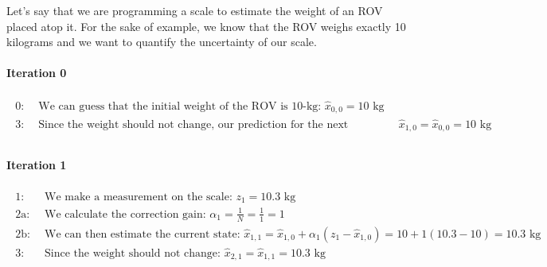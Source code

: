         \begin{example} Let's say that we are programming a scale to estimate the weight of an ROV placed atop it.
        For the sake of example, we know that the ROV weighs exactly 10 kilograms and we want to quantify the uncertainty of our scale. 
        \paragraph{Iteration 0}
        \begin{gather*}
            \begin{aligned} 
                0:& \text{ We can guess that the initial weight of the ROV is 10-kg: } \hat{x}_{0,0} = 10 \text{ kg} \\
                3:& \text{ Since the weight should not change, our prediction for the next measurement is: } \hat{x}_{1,0} = \hat{x}_{0,0} = 10 \text{ kg} \\
            \end{aligned}
        \end{gather*}
        
        \paragraph{Iteration 1}
        \begin{gather*}
            \begin{aligned} 
                1:& \text{ We make a measurement on the scale: } z_1 = 10.3 \text{ kg} \\
                2\text{a}:& \text{ We calculate the correction gain: } \alpha_1 = \frac{1}{N} = \frac{1}{1} = 1 \\
                2\text{b}:& \text{ We can then estimate the current state: } \hat{x}_{1,1} = \hat{x}_{1,0} + \alpha_1(z_1 - \hat{x}_{1,0}) = 10 + 1(10.3 - 10) = 10.3 \text{ kg} \\
                3:& \text{ Since the weight should not change: } \hat{x}_{2,1} = \hat{x}_{1,1} = 10.3 \text{ kg} \\
            \end{aligned}
        \end{gather*}


\end{example}
